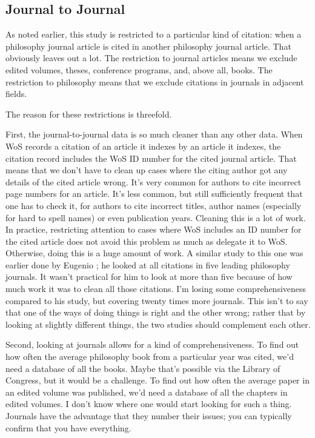 \documentclass[
]{ergoclass}
\begin{document}
\subsection{Journal to Journal}\label{sec-journal-to-journal}

As noted earlier, this study is restricted to a particular kind of
citation: when a philosophy journal article is cited in another
philosophy journal article. That obviously leaves out a lot. The
restriction to journal articles means we exclude edited volumes, theses,
conference programs, and, above all, books. The restriction to
philosophy means that we exclude citations in journals in adjacent
fields.

The reason for these restrictions is threefold.

First, the journal-to-journal data is so much cleaner than any other
data. When WoS records a citation of an article it indexes by an article
it indexes, the citation record includes the WoS ID number for the cited
journal article. That means that we don't have to clean up cases where
the citing author got any details of the cited article wrong. It's very
common for authors to cite incorrect page numbers for an article. It's
less common, but still sufficiently frequent that one has to check it,
for authors to cite incorrect titles, author names (especially for hard
to spell names) or even publication years. Cleaning this is a lot of
work. In practice, restricting attention to cases where WoS includes an
ID number for the cited article does not avoid this problem as much as
delegate it to WoS. Otherwise, doing this is a huge amount of work. A
similar study to this one was earlier done by Eugenio
\citet{Petrovich2024}; he looked at all citations in five leading
philosophy journals. It wasn't practical for him to look at more than
five because of how much work it was to clean all those citations. I'm
losing some comprehensiveness compared to his study, but covering twenty
times more journals. This isn't to say that one of the ways of doing
things is right and the other wrong; rather that by looking at slightly
different things, the two studies should complement each other.

Second, looking at journals allows for a kind of comprehensiveness. To
find out how often the average philosophy book from a particular year
was cited, we'd need a database of all the books. Maybe that's possible
via the Library of Congress, but it would be a challenge. To find out
how often the average paper in an edited volume was published, we'd need
a database of all the chapters in edited volumes. I don't know where one
would start looking for such a thing. Journals have the advantage that
they number their issues; you can typically confirm that you have
everything.
\end{document}
